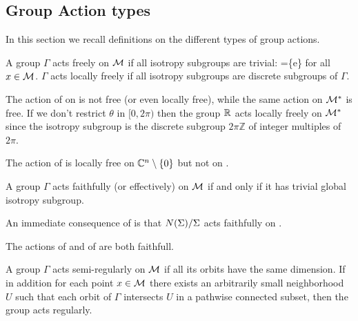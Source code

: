 \subsection{Group Action types}

In this section we recall definitions on the different types of group actions. 

\begin{definition}
\label{def:free}
A group $\Gamma$ acts freely on $\mathcal{M}$ if all isotropy subgroups are trivial: =\{e\} for all $x\in \mathcal{M}$.
$\Gamma$ acts locally freely if all isotropy subgroups are discrete subgroups of $\Gamma$.
\end{definition}

\begin{example}
The action  of  on  is not free (or even locally free), while the same action on $\mathcal{M}^*$ is free. If we don't
restrict $\theta$ in $[0,2\pi)$ then the group $\mathbb{R}^{}$ acts locally freely on $\mathcal{M}^*$
since the isotropy subgroup is the discrete subgroup $2\pi\mathbb{Z}$ of integer multiples of $2\pi$.
\end{example}

\begin{example}
The action  of  is locally free on $\mathbb{C}^{n}\setminus\{0\}$ but not on .
\end{example}

\begin{definition}
\label{def:faithfull}
A group $\Gamma$ acts faithfully (or effectively) on $\mathcal{M}$ if and only if it has trivial global isotropy subgroup.
\end{definition}

An immediate consequence of  is that $N(\Sigma)/\Sigma$ acts faithfully on \Fix{\Sigma}.


\begin{example}
 The actions  of  and  of  are both faithfull. 
\end{example}

\begin{definition}
\label{def:regular}
A group $\Gamma$ acts semi-regularly on $\mathcal{M}$ if all its orbits have the same dimension. 
If in addition for each point $x\in \mathcal{M}$
there exists an arbitrarily small neighborhood $U$ such that each orbit of $\Gamma$ intersects $U$ in a pathwise connected subset, then the group
acts regularly.
\end{definition}

